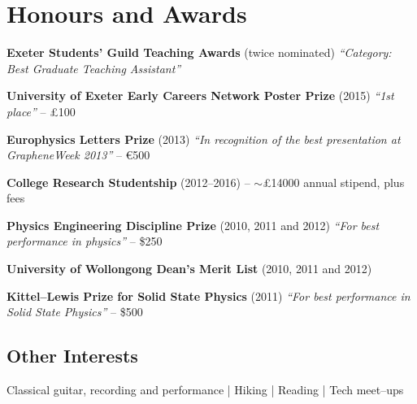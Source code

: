 \documentclass[11pt,a4paper,sans]{moderncv}        %
\begin{document}
\section{Honours and Awards}
\vspace{5pt}
\begin{itemize}\small{
\item{\textbf{Exeter Students’ Guild Teaching Awards} \small{(twice nominated) \textit{``Category: Best Graduate Teaching Assistant''}}}
\item{\textbf{University of Exeter Early Careers Network Poster Prize} \small{(2015) \textit{``1st place''}} -- £100}
\item{\textbf{Europhysics Letters Prize} \small{(2013) \textit{``In recognition of the best presentation at GrapheneWeek 2013''}} -- \euro 500}
\item{\textbf{College Research Studentship}\small{ (2012--2016)} -- $\sim$£14000 annual stipend, plus fees}
\item{\textbf{Physics Engineering Discipline Prize} \small{(2010, 2011 and 2012) \textit{``For best performance in physics''}} -- \$250}
\item{\textbf{University of Wollongong Dean's Merit List}\small{ (2010, 2011 and 2012)}}
\item{\textbf{Kittel--Lewis Prize for Solid State Physics}\small{ (2011) \textit{``For best performance in Solid State Physics''}} -- \$500}}
\end{itemize}

\vspace{5pt}
\subsection{Other Interests}
\vspace{5pt}
\begin{center}
Classical guitar, recording and performance | Hiking | Reading | Tech meet--ups
\end{center}



\end{document}
